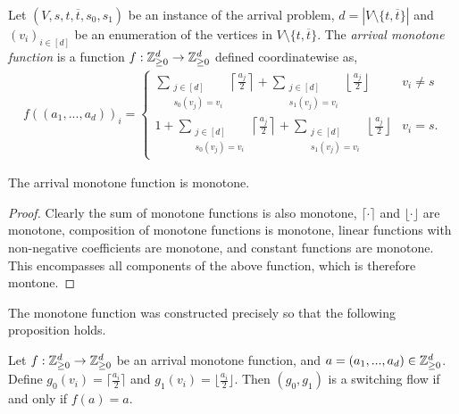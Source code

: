   \begin{definition}
    Let $(V, s, t, \overline{t}, s_0, s_1)$ be an instance of the arrival problem,
    $d = |V \setminus \{t, \overline{t}\}|$ and
    $(v_i)_{i \in [d]}$ be an enumeration of the vertices in 
    $V \setminus \{t, \overline{t}\}$. The \emph{arrival monotone function} is a function
    $f : \mathbb{Z}_{\geq 0}^d \to \mathbb{Z}_{\geq 0}^d$ defined coordinatewise as,
  \begin{align*}
    f((a_1, ..., a_d))_i = \begin{cases}
    \sum_{\substack{j \in [d] \\ s_0(v_j) = v_i}} \left\lceil \frac{a_j}{2} \right\rceil
      + \sum_{\substack{j \in [d] \\ s_1(v_j) = v_i}} \left\lfloor \frac{a_j}{2} \right\rfloor
      & v_i \neq s \\
    1 + \sum_{\substack{j \in [d] \\ s_0(v_j) = v_i}} \left\lceil \frac{a_j}{2} \right\rceil
      + \sum_{\substack{j \in [d] \\ s_1(v_j) = v_i}} \left\lfloor \frac{a_j}{2} \right\rfloor
      & v_i = s.
    \end{cases}
  \end{align*}
  \end{definition}
  \begin{lemma}\label{arrMonotoneIsMonotone}
    The arrival monotone function is monotone.
  \end{lemma}
  \begin{proof}
    Clearly the sum of monotone functions is also monotone, $\lceil \cdot \rceil$ and $\lfloor \cdot \rfloor$
    are monotone, composition of monotone functions is monotone, linear functions with non-negative coefficients
    are monotone, and constant functions are monotone. This encompasses all components of the above function,
    which is therefore montone.
  \end{proof}
  The monotone function was constructed precisely so that the following proposition holds.
  \begin{prop}\label{fixpointIsFlow}
    Let $f : \mathbb{Z}_{\geq 0}^d \to \mathbb{Z}_{\geq 0}^d$ be an arrival monotone function, and $a = (a_1, ..., a_d) \in \mathbb{Z}_{\geq 0}^d$. 
    Define $g_0(v_i) = \lceil \frac{a_i}{2} \rceil$ and $g_1(v_i) = \lfloor \frac{a_i}{2} \rfloor$. 
    Then $(g_0, g_1)$ is a switching flow if and only if $f(a) = a$.
  \end{prop}
